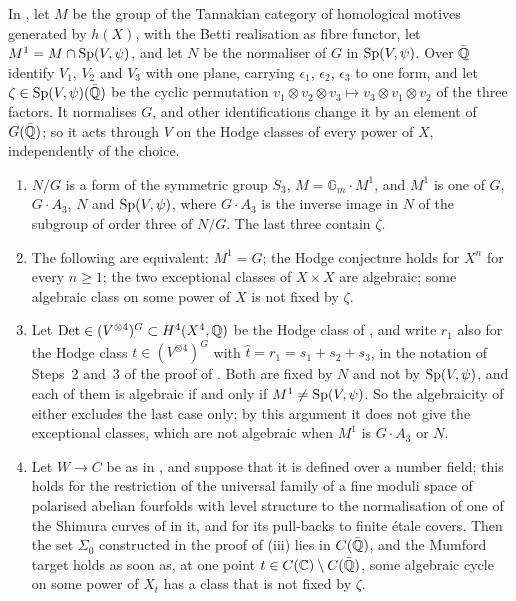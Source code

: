 \begin{proposition}\label{prop:mumfordmotivic}
In , let $M$ be the group of the Tannakian category of
homological motives generated by $h(X)$, with the Betti realisation as fibre
functor, let $M^{1}=M\cap\operatorname{Sp}(V,\psi)$, and let $N$ be the normaliser of $G$ in
$\operatorname{Sp}(V,\psi)$. Over $\bar{\mathbb{Q}}$ identify $V_{1}$, $V_{2}$ and $V_{3}$ with one
plane, carrying $\epsilon_{1}$, $\epsilon_{2}$, $\epsilon_{3}$ to one form, and
let $\zeta\in\operatorname{Sp}(V,\psi)(\bar{\mathbb{Q}})$ be the cyclic permutation
$v_{1}\otimes v_{2}\otimes v_{3}\mapsto v_{3}\otimes v_{1}\otimes v_{2}$ of
the three factors. It normalises $G$, and other identifications change it by
an element of $G(\bar{\mathbb{Q}})$; so it acts through $V$ on the Hodge classes of
every power of $X$, independently of the choice.
\begin{enumerate}[label=\textup{(\roman*)},leftmargin=2.6em,itemsep=2pt]
\item $N/G$ is a form of the symmetric group $S_{3}$,
  $M=\mathbb{G}_{m}\cdot M^{1}$, and $M^{1}$ is one of $G$, $G\cdot A_{3}$,
  $N$ and $\operatorname{Sp}(V,\psi)$, where $G\cdot A_{3}$ is the inverse image in $N$ of
  the subgroup of order three of $N/G$. The last three contain $\zeta$.
\item The following are equivalent: $M^{1}=G$; the Hodge conjecture holds for
  $X^{n}$ for every $n\ge1$; the two exceptional classes of $X\times X$ are
  algebraic; some algebraic class on some power of $X$ is not fixed by
  $\zeta$.
\item Let $\mathrm{Det}\in(V^{\otimes4})^{G}\subset H^{4}(X^{4},\mathbb{Q})$ be the
  Hodge class of , and write $r_{1}$ also for the Hodge
  class $t\in(V^{\otimes4})^{G}$ with $\hat{t}=r_{1}=s_{1}+s_{2}+s_{3}$, in the
  notation of Steps~2 and~3 of the proof of . Both
  are fixed by $N$ and not by $\operatorname{Sp}(V,\psi)$, and each of them is algebraic if
  and only if $M^{1}\ne\operatorname{Sp}(V,\psi)$. So the algebraicity of either excludes
  the last case only; by this argument it does not give the exceptional
  classes, which are not algebraic when $M^{1}$ is $G\cdot A_{3}$ or $N$.
\item Let $W\to C$ be as in , and suppose that it
  is defined over a number field; this holds for the restriction of the
  universal family of a fine moduli space of polarised abelian fourfolds with
  level structure to the normalisation of one of the Shimura curves of
  \cite{Mum69} in it, and for its pull-backs to finite \'etale covers. Then the
  set $\Sigma_{0}$ constructed in the proof of (iii) lies
  in $C(\bar{\mathbb{Q}})$, and the Mumford target holds as soon as, at one point
  $t\in C(\mathbb{C})\setminus C(\bar{\mathbb{Q}})$, some algebraic cycle on some power of
  $X_{t}$ has a class that is not fixed by $\zeta$.
\end{enumerate}
\end{proposition}

